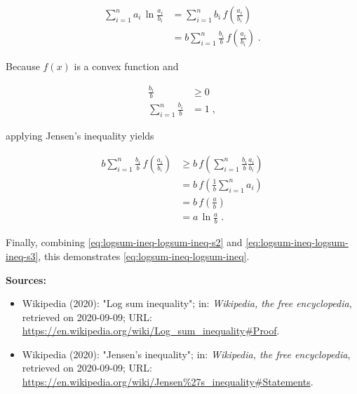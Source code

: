 \documentclass[a4paper,12pt,twoside]{book}
\begin{document}
\begin{equation} \label{eq:logsum-ineq-logsum-ineq-s2}
\begin{split}
\sum_{i=1}^n a_i \, \ln \frac{a_i}{b_i} &= \sum_{i=1}^n b_i \, f\left( \frac{a_i}{b_i} \right) \\
&= b \sum_{i=1}^n \frac{b_i}{b} \, f\left( \frac{a_i}{b_i} \right) \; .
\end{split}
\end{equation}

Because $f(x)$ is a convex function and

\begin{equation} \label{eq:logsum-ineq-sum-bi-b}
\begin{split}
\frac{b_i}{b} &\geq 0 \\
\sum_{i=1}^n \frac{b_i}{b} &= 1 \; ,
\end{split}
\end{equation}

applying Jensen's inequality yields

\begin{equation} \label{eq:logsum-ineq-logsum-ineq-s3}
\begin{split}
b \sum_{i=1}^n \frac{b_i}{b} \, f\left( \frac{a_i}{b_i} \right) &\geq b \, f\left( \sum_{i=1}^n \frac{b_i}{b} \frac{a_i}{b_i} \right) \\
&= b \, f\left( \frac{1}{b} \sum_{i=1}^n a_i \right) \\
&= b \, f\left( \frac{a}{b} \right) \\
&= a \, \ln \frac{a}{b} \; .
\end{split}
\end{equation}

Finally, combining \eqref{eq:logsum-ineq-logsum-ineq-s2} and \eqref{eq:logsum-ineq-logsum-ineq-s3}, this demonstrates \eqref{eq:logsum-ineq-logsum-ineq}.


\vspace{1em}
\textbf{Sources:}
\begin{itemize}
\item Wikipedia (2020): "Log sum inequality"; in: \textit{Wikipedia, the free encyclopedia}, retrieved on 2020-09-09; URL: \url{https://en.wikipedia.org/wiki/Log_sum_inequality#Proof}.
\item Wikipedia (2020): "Jensen's inequality"; in: \textit{Wikipedia, the free encyclopedia}, retrieved on 2020-09-09; URL: \url{https://en.wikipedia.org/wiki/Jensen%27s_inequality#Statements}.
\end{itemize}
\end{document}
